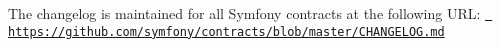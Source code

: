 The changelog is maintained for all Symfony contracts at the following URL\+: \href{https://github.com/symfony/contracts/blob/master/CHANGELOG.md}{\texttt{ https\+://github.\+com/symfony/contracts/blob/master/\+CHANGELOG.\+md}} 